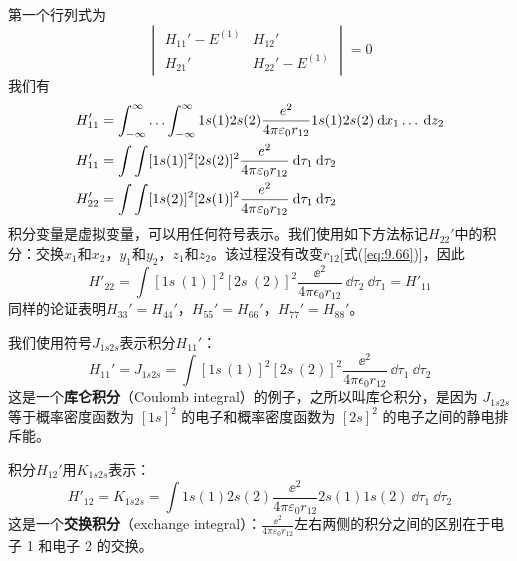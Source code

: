     第一个行列式为
    \begin{equation}
        \begin{vmatrix}
            H_{11}' - E^{\left(1\right)} & H_{12}' \\
            H_{21}' & H_{22}' - E^{\left(1\right)}
        \end{vmatrix} = 0
        \label{eq:9.95}
    \end{equation}
    我们有
    \begin{equation*}
        \begin{aligned}
            H_{11}^{\prime} & =\int_{-\infty}^{\infty} \ldots \int_{-\infty}^{\infty} 1 s(1) 2 s(2) \frac{e^{2}}{4 \pi \varepsilon_{0} r_{12}} 1 s(1) 2 s(2) \:\dd x_{1} \ldots\: \dd z_{2} \\
            H_{11}^{\prime} & =\int\int[1 s(1)]^{2}[2 s(2)]^{2} \frac{e^{2}}{4 \pi \varepsilon_{0} r_{12}} \:\dd \tau_{1}\: \dd \tau_{2} \\
            H_{22}^{\prime} & =\int\int[1 s(2)]^{2}[2 s(1)]^{2} \frac{e^{2}}{4 \pi \varepsilon_{0} r_{12}} \:\dd \tau_{1} \:\dd \tau_{2}
        \end{aligned}
    \end{equation*}
    积分变量是虚拟变量，可以用任何符号表示。我们使用如下方法标记$H_{22}'$中的积分：交换$x_1$和$x_2$，$y_1$和$y_2$，$z_1$和$z_2$。该过程没有改变$r_{12}$[式(\ref{eq:9.66})]，因此
    \begin{equation}
        H'_{22} = \int [1s\ (1)]^2 [2s\ (2)]^2 \frac{\ee ^2}{4\pi\epsilon_0 r_{12}}\: \dd \tau_2\: \dd \tau_1 = H'_{11}
        \label{eq:9.96}
    \end{equation}
    同样的论证表明$H_{33}' = H_{44}'$，$H_{55}' = H_{66}'$，$H_{77}' = H_{88}'$。

    我们使用符号$J_{1s2s}$表示积分$H_{11}'$：
    \begin{equation}
        H_{11}' = J_{1s2s} = \int [1s\,(1)]^2 [2s\,(2)]^2 \frac{\ee ^2}{4\pi \epsilon_0 r_{12}}\: \dd \tau_1\: \dd \tau_2
        \label{eq:9.97}
    \end{equation}
    这是一个\textbf{库仑积分}（Coulomb integral）的例子，之所以叫库仑积分，是因为 $J_{1s2s}$ 等于概率密度函数为 $\left[1s\right]^2$ 的电子和概率密度函数为 $\left[2s\right]^2$ 的电子之间的静电排斥能。

    积分$H_{12}'$用$K_{1s2s}$表示：
    \begin{equation}
        H'_{12} = K_{1s2s} = \int 1s\left(1\right)2s\left(2\right) \frac{\ee ^2}{4\pi\varepsilon_0r_{12}} 2s\left(1\right)1s\left(2\right)\: \dd \tau_1 \:\dd \tau_2
        \label{eq:9.98}
    \end{equation}
    这是一个\textbf{交换积分}（exchange integral）：$\frac{\ee ^2}{4\pi\varepsilon_0r_{12}}$左右两侧的积分之间的区别在于电子 1 和电子 2 的交换。

